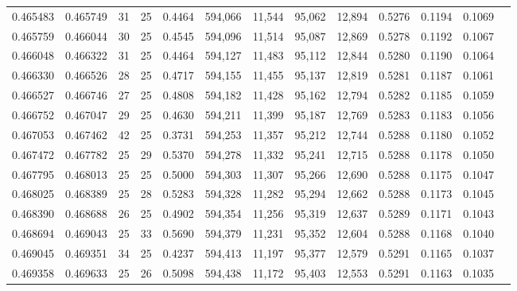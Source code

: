 \begin{tabular}{rrrrrrrrrrrrr}
0.465483 & 0.465749 &    31 &  25 &                                     0.4464 & 594,066 &  11,544 &  95,062 &  12,894 & 0.5276 & 0.1194 & 0.1069 \\
0.465759 & 0.466044 &    30 &  25 &                                     0.4545 & 594,096 &  11,514 &  95,087 &  12,869 & 0.5278 & 0.1192 & 0.1067 \\
0.466048 & 0.466322 &    31 &  25 &                                     0.4464 & 594,127 &  11,483 &  95,112 &  12,844 & 0.5280 & 0.1190 & 0.1064 \\
0.466330 & 0.466526 &    28 &  25 &                                     0.4717 & 594,155 &  11,455 &  95,137 &  12,819 & 0.5281 & 0.1187 & 0.1061 \\
0.466527 & 0.466746 &    27 &  25 &                                     0.4808 & 594,182 &  11,428 &  95,162 &  12,794 & 0.5282 & 0.1185 & 0.1059 \\
0.466752 & 0.467047 &    29 &  25 &                                     0.4630 & 594,211 &  11,399 &  95,187 &  12,769 & 0.5283 & 0.1183 & 0.1056 \\
0.467053 & 0.467462 &    42 &  25 &                                     0.3731 & 594,253 &  11,357 &  95,212 &  12,744 & 0.5288 & 0.1180 & 0.1052 \\
0.467472 & 0.467782 &    25 &  29 &                                     0.5370 & 594,278 &  11,332 &  95,241 &  12,715 & 0.5288 & 0.1178 & 0.1050 \\
0.467795 & 0.468013 &    25 &  25 &                                     0.5000 & 594,303 &  11,307 &  95,266 &  12,690 & 0.5288 & 0.1175 & 0.1047 \\
0.468025 & 0.468389 &    25 &  28 &                                     0.5283 & 594,328 &  11,282 &  95,294 &  12,662 & 0.5288 & 0.1173 & 0.1045 \\
0.468390 & 0.468688 &    26 &  25 &                                     0.4902 & 594,354 &  11,256 &  95,319 &  12,637 & 0.5289 & 0.1171 & 0.1043 \\
0.468694 & 0.469043 &    25 &  33 &                                     0.5690 & 594,379 &  11,231 &  95,352 &  12,604 & 0.5288 & 0.1168 & 0.1040 \\
0.469045 & 0.469351 &    34 &  25 &                                     0.4237 & 594,413 &  11,197 &  95,377 &  12,579 & 0.5291 & 0.1165 & 0.1037 \\
0.469358 & 0.469633 &    25 &  26 &                                     0.5098 & 594,438 &  11,172 &  95,403 &  12,553 & 0.5291 & 0.1163 & 0.1035 \\

\end{tabular}
